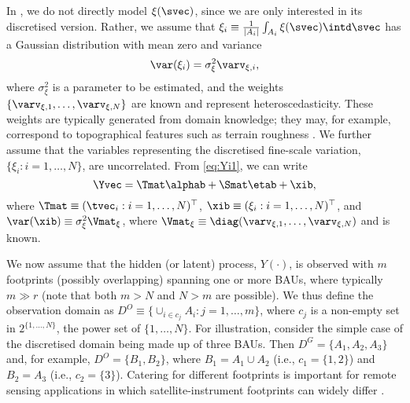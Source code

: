 In , we do not directly model $\xi(\svec)$, since we are only interested in its discretised version. Rather, we assume that $\xi_i \equiv \frac{1}{|A_i|}\int_{A_i} \xi(\svec)\intd\svec$ has a Gaussian distribution with mean zero and variance
\begin{equation*}
\var(\xi_i) = \sigma^2_\xi \varv_{\xi,i},
\end{equation*}
where $\sigma^2_\xi$ is a parameter to be estimated, and the weights $\{\varv_{\xi,1},\dots,\varv_{\xi,N}\}$ are known and represent heteroscedasticity. These weights are typically generated from domain knowledge; they may, for example, correspond to topographical features such as terrain roughness \citep{Zammit_2015}. We further assume that the variables representing the discretised fine-scale variation, $\{\xi_i: i = 1,\dots,N\}$, are uncorrelated. From \eqref{eq:Yi1}, we can write
\begin{equation}\label{eq:SRE_Y}
\Yvec = \Tmat\alphab + \Smat\etab + \xib,
\end{equation}
where $\Tmat \equiv (\tvec_i: i = 1,\dots,N)^\top$, $\xib \equiv (\xi_i : i = 1,\dots,N)^\top$, and $\var(\xib) \equiv \sigma^2_\xi \Vmat_\xi$, where $\Vmat_\xi \equiv \diag(\varv_{\xi,1},\dots,\varv_{\xi,N})$ and is known.

We now  assume that the hidden (or latent) process, $Y(\cdot)$, is observed with $m$ footprints (possibly overlapping) spanning one or more BAUs, where typically $m \gg r$ (note that both $m > N$ and $N >m$ are possible). We thus define the observation domain as $D^O \equiv \{ \cup_{i \in c_j} A_i : j = 1,\dots,m \}$, where $c_j$ is a non-empty set in $2^{\{1,\dots,N\}}$, the power set of $\{1,\dots,N\}$. For illustration, consider the simple case of  the discretised domain being made up of three BAUs. Then $D^G = \{A_1,A_2,A_3\}$ and, for example, $D^O = \{B_1, B_2\}$, where $B_1 = A_1 \cup A_2$ (i.e., $c_1 = \{1,2\}$) and $B_2 = A_3$ (i.e., $c_2 = \{3\}$). Catering for different footprints is important for remote sensing applications in which satellite-instrument footprints can widely differ \citep[e.g.,][]{Zammit_2015}.

